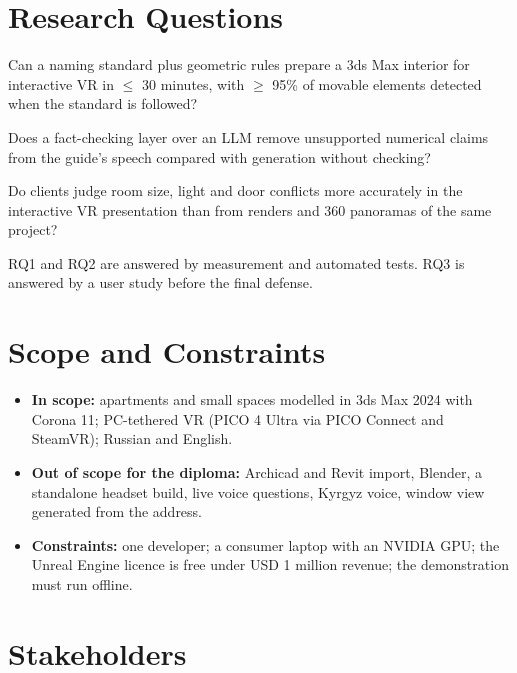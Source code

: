 \section{Research Questions}

\begin{description}[leftmargin=1.2cm,style=nextline]
\item[RQ1] Can a naming standard plus geometric rules prepare a 3ds Max interior for interactive VR in $\le$ 30 minutes, with $\ge$ 95\% of movable elements detected when the standard is followed?
\item[RQ2] Does a fact-checking layer over an LLM remove unsupported numerical claims from the guide's speech compared with generation without checking?
\item[RQ3] Do clients judge room size, light and door conflicts more accurately in the interactive VR presentation than from renders and 360\textdegree{} panoramas of the same project?
\end{description}

RQ1 and RQ2 are answered by measurement and automated tests. RQ3 is answered by a user study before the final defense.

\section{Scope and Constraints}
\label{sec:scope}

\begin{itemize}
\item \textbf{In scope:} apartments and small spaces modelled in 3ds Max 2024 with Corona 11; PC-tethered VR (PICO 4 Ultra via PICO Connect and SteamVR); Russian and English.
\item \textbf{Out of scope for the diploma:} Archicad and Revit import, Blender, a standalone headset build, live voice questions, Kyrgyz voice, window view generated from the address.
\item \textbf{Constraints:} one developer; a consumer laptop with an NVIDIA GPU; the Unreal Engine licence is free under USD 1 million revenue; the demonstration must run offline.
\end{itemize}

\section{Stakeholders}

